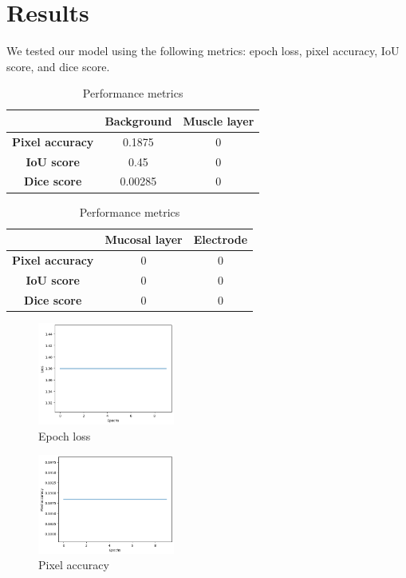 \section{Results}
\label{sec:results}

We tested our model using the following metrics: epoch loss, pixel accuracy, IoU score, and dice score.

\begin{table}[htbp]
    \centering
    \caption{Performance metrics}
    \label{tab:example}

    \begin{tabular}{|c|c|c|}
        \hline
        \textbf{} & \textbf{Background} & \textbf{Muscle layer} \\
        \hline
        \textbf{Pixel accuracy} & 0.1875 & 0 \\
        \textbf{IoU score} & 0.45 & 0 \\
        \textbf{Dice score} & 0.00285 & 0 \\
        \hline
    \end{tabular}

    \begin{tabular}{|c|c|c|}
        \hline
        \textbf{} & \textbf{Mucosal layer} & \textbf{Electrode} \\
        \hline
        \textbf{Pixel accuracy} & 0 & 0 \\
        \textbf{IoU score} & 0 & 0 \\
        \textbf{Dice score} & 0 & 0 \\
        \hline
    \end{tabular}

\end{table}

\begin{figure}[!]
    \centering
    \includegraphics[width=0.4\textwidth]{Images/loss}
    \caption{Epoch loss}
    \label{fig:loss}
\end{figure}

\begin{figure}[htp!]
    \centering
    \includegraphics[width=0.4\textwidth]{Images/accuracy}
    \caption{Pixel accuracy}
    \label{fig:accuracy}
\end{figure}

